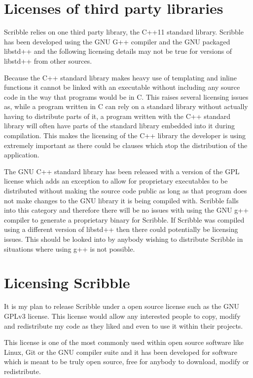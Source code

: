 \documentclass[]{final_report}
\begin{document}
\section{Licenses of third party libraries}

Scribble relies on one third party library, the C++11 standard library. Scribble has been developed using the GNU G++ compiler and the GNU packaged libstd++ and the following licensing details may not be true for  versions of libstd++ from other sources.

Because the C++ standard library makes heavy use of templating and inline functions it cannot be linked with an executable without including any source code in the way that programs would be in C. This raises several licensing issues as, while a program written in C can rely on a standard library without actually having to distribute parts of it, a program written with the C++ standard library will often have parts of the standard library embedded into it during compilation. This makes the licensing of the C++ library the developer is using extremely important as there could be clauses which stop the distribution of the application.

The GNU C++ standard library has been released with a version of the GPL license which adds an exception to allow for proprietary executables to be distributed without making the source code public as long as that program does not make changes to the GNU library it is being compiled with\cite{GCCGPL}. Scribble falls into this category and therefore there will be no issues with using the GNU g++ compiler to generate a proprietary binary for Scribble. If Scribble was compiled using a different version of libstd++ then there could potentially be licensing issues. This should be looked into by anybody wishing to distribute Scribble in situations where using g++ is not possible.

\section{Licensing Scribble}

It is my plan to release Scribble under a open source license such as the GNU GPLv3 license. This license would allow any interested people to copy, modify and redistribute my code as they liked and even to use it within their projects.

This license is one of the most commonly used within open source software like Linux, Git or the GNU compiler suite and it has been developed for software which is meant to be truly open source, free for anybody to download, modify or redistribute.
\end{document}
